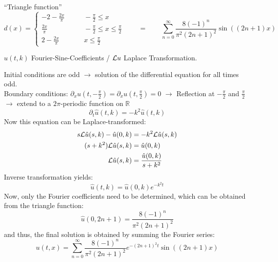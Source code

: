 ``Triangle function''
\[
d(x)
=
\begin{cases}
\displaystyle-2-\frac{2x}{\pi}&\qquad \displaystyle-\frac{\pi}2\le x\\
\displaystyle\frac{2x}{\pi}&\qquad \displaystyle-\frac{\pi}2\le x\le \frac{\pi}2\\
\displaystyle2-\frac{2x}{\pi}&\qquad \displaystyle x\le\frac{\pi}2
\end{cases}
 \qquad = \qquad \sum_{n=0}^\infty \frac{8(-1)^n}{\pi^2(2n+1)^2}\sin ((2n+1)x)
\]

 $\hat u(t,k)$ Fourier-Sine-Coefficients / ${\cal L} u$ Laplace Transformation.

Initial conditions are odd $\rightarrow$ solution of the
differential equation for all times odd. \\
Boundary conditions:
$\partial_xu(t,-\frac{\pi}2)=\partial_xu(t,\frac{\pi}2)=0$
$\rightarrow$ Reflection at
$-\frac{\pi}2$ and $\frac{\pi}2$ $\rightarrow$ extend to a $2\pi$-periodic
function on $\mathbb R$
\[
\partial_t\hat u(t,k)=-k^2\hat u(t,k)
\]
Now this equation can be Laplace-transformed:
\begin{align*}
s{\cal L}\hat u(s,k) - \hat u(0,k)&=-k^2 {\cal L}\hat u(s,k)\\
(s+k^2){\cal L}\hat u(s,k)&=\hat u(0,k)\\
{\cal L}\hat u(s,k)&=\frac{\hat u(0,k)}{s+k^2}
\end{align*}
Inverse transformation yields:
\[
\hat u(t,k)=\hat u(0,k) e^{-k^2t}
\]
Now, only the Fourier coefficients need to be determined, which can be obtained from the triangle function:
\[
\hat u(0,2n+1)=
\frac{8(-1)^n}{\pi^2(2n+1)^2}
\]
and thus, the final solution is obtained by summing the Fourier series:
\[
u(t,x)=
\sum_{n=0}^\infty \frac{8(-1)^n}{\pi^2(2n+1)^2}e^{-(2n+1)^2t}\sin((2n+1)x)
\]
